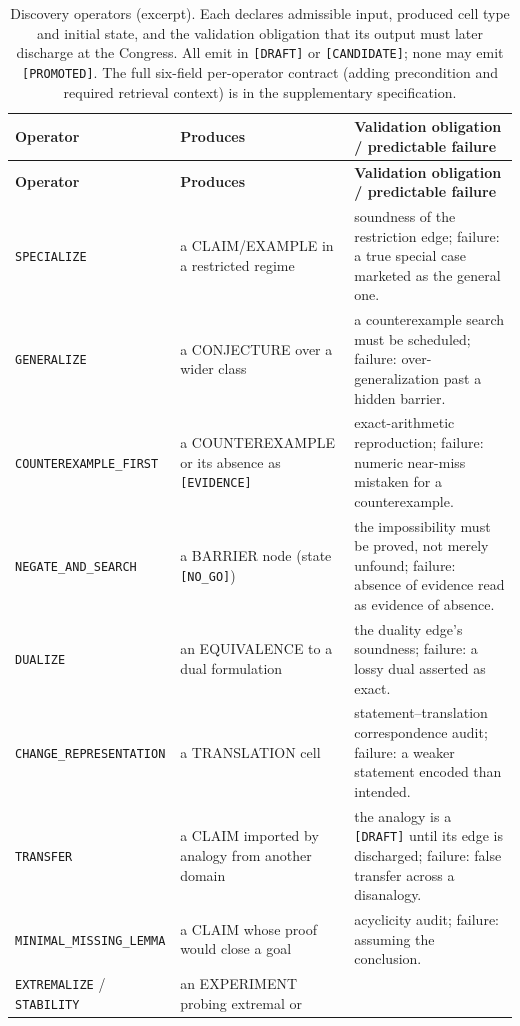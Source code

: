 \documentclass[11pt]{amsart}
\theoremstyle{definition}
\theoremstyle{remark}
\newcommand{\state}[1]{\texttt{[#1]}}
\newcommand{\otype}[1]{\textsc{#1}}
\newcommand{\op}[1]{\texttt{#1}}
\begin{document}
{\footnotesize
\begin{longtable}{@{}p{}p{}p{}@{}}
\caption{Discovery operators (excerpt). Each declares admissible input,
produced cell type and initial state, and the validation obligation that its
output must later discharge at the Congress. All emit in \state{DRAFT} or
\state{CANDIDATE}; none may emit \state{PROMOTED}. The full six-field per-operator
contract (adding precondition and required retrieval context) is in the
supplementary specification.}\label{tab:ops}\\
\toprule
\textbf{Operator} & \textbf{Produces} & \textbf{Validation obligation /
predictable failure}\\ \midrule
\endfirsthead
\toprule
\textbf{Operator} & \textbf{Produces} & \textbf{Validation obligation /
predictable failure}\\ \midrule
\endhead
\op{SPECIALIZE} & a \otype{CLAIM}/\otype{EXAMPLE} in a restricted regime &
soundness of the restriction edge; failure: a true special case marketed as the
general one.\\
\op{GENERALIZE} & a \otype{CONJECTURE} over a wider class & a counterexample
search must be scheduled; failure: over-generalization past a hidden barrier.\\
\op{COUNTEREXAMPLE\_FIRST} & a \otype{COUNTEREXAMPLE} or its absence as
\state{EVIDENCE} & exact-arithmetic reproduction; failure: numeric near-miss
mistaken for a counterexample.\\
\op{NEGATE\_AND\_SEARCH} & a \otype{BARRIER} node (state \state{NO\_GO}) &
the impossibility must be proved, not merely unfound; failure: absence of
evidence read as evidence of absence.\\
\op{DUALIZE} & an \otype{EQUIVALENCE} to a dual formulation & the duality edge's
soundness; failure: a lossy dual asserted as exact.\\
\op{CHANGE\_REPRESENTATION} & a \otype{TRANSLATION} cell & statement--translation
correspondence audit; failure: a weaker statement encoded than intended.\\
\op{TRANSFER} & a \otype{CLAIM} imported by analogy from another domain &
the analogy is a \state{DRAFT} until its edge is discharged; failure: false
transfer across a disanalogy.\\
\op{MINIMAL\_MISSING\_LEMMA} & a \otype{CLAIM} whose proof would close a goal &
acyclicity audit; failure: assuming the conclusion.\\
\op{EXTREMALIZE} / \op{STABILITY} & an \otype{EXPERIMENT} probing extremal or

\end{longtable}}
\end{document}
